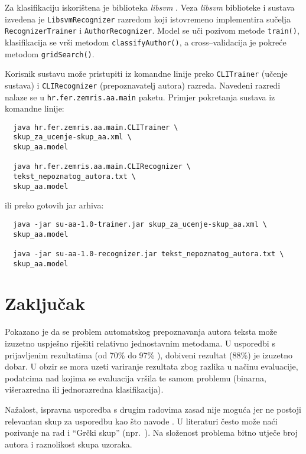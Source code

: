 \documentclass{article}
\begin{document}

Za klasifikaciju iskorištena je biblioteka \emph{libsvm} \citep{CC01a}. Veza
\emph{libsvm} biblioteke i sustava izvedena je \texttt{LibsvmRecognizer}
razredom koji istovremeno implementira sučelja \texttt{RecognizerTrainer} i
\texttt{AuthorRecognizer}. Model se uči pozivom metode \texttt{train()},
klasifikacija se vrši metodom \texttt{classifyAuthor()}, a cross--validacija je
pokreće metodom \texttt{gridSearch()}.

Korisnik sustavu može pristupiti iz komandne linije preko \texttt{CLITrainer}
(učenje sustava) i \texttt{CLIRecognizer} (prepoznavatelj autora) razreda. Navedeni razredi nalaze se u
\texttt{hr.fer.zemris.aa.main} paketu. Primjer pokretanja sustava iz
komandne linije:
\begin{verbatim}
  java hr.fer.zemris.aa.main.CLITrainer \
  skup_za_ucenje-skup_aa.xml \
  skup_aa.model
  
  java hr.fer.zemris.aa.main.CLIRecognizer \
  tekst_nepoznatog_autora.txt \
  skup_aa.model
\end{verbatim}
ili preko gotovih jar arhiva:
\begin{verbatim}
  java -jar su-aa-1.0-trainer.jar skup_za_ucenje-skup_aa.xml \
  skup_aa.model

  java -jar su-aa-1.0-recognizer.jar tekst_nepoznatog_autora.txt \
  skup_aa.model
\end{verbatim}

\newpage

\section{Zaključak}
Pokazano je da se problem automatskog prepoznavanja autora teksta može izuzetno
uspješno riješiti relativno jednostavnim metodama. U usporedbi s prijavljenim
rezultatima (od 70\% do 97\%
\citep{coyotl2006authorship,keselj2003n,luyckx2005shallow,stamatatos2001computer,stamatatos1999automatic}),
dobiveni rezultat (88\%) je izuzetno dobar. U obzir se mora uzeti variranje
rezultata zbog razlika u načinu evaluacije, podatcima nad kojima se evaluacija
vršila te samom problemu (binarna, višerazredna ili jednorazredna
klasifikacija).

Nažalost, ispravna usporedba s drugim radovima zasad nije moguća jer ne postoji
relevantan skup za usporedbu kao što navode \citep{zhao2005effective}. U
literaturi često može naći pozivanje na rad
\citep{stamatatos2001computer,stamatatos1999automatic} i ``Grčki skup''
(npr.~\citep{keselj2003n}). Na složenost problema bitno utječe broj autora i
raznolikost skupa uzoraka.
\end{document}

